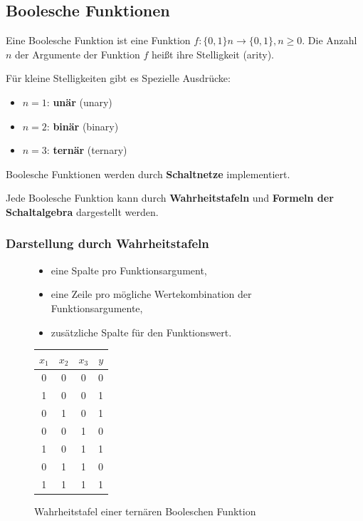 \documentclass[12pt]{report}
\begin{document}
\subsection{Boolesche Funktionen}
\begin{defbox}
  Eine Boolesche Funktion ist eine Funktion $f : \{0, 1\}n \rightarrow \{0, 1\}, n \geq 0$.
  Die Anzahl $n$ der Argumente der Funktion $f$ heißt ihre Stelligkeit (arity).
  
  Für kleine Stelligkeiten gibt es Spezielle Ausdrücke:
  \begin{itemize}
    \item $n=1$: \textbf{unär} (unary)
    \item $n=2$: \textbf{binär} (binary)
    \item $n=3$: \textbf{ternär} (ternary)
  \end{itemize}
  
  Boolesche Funktionen werden durch \textbf{Schaltnetze} implementiert.
\end{defbox}

Jede Boolesche Funktion kann durch \textbf{Wahrheitstafeln} und \textbf{Formeln der Schaltalgebra} dargestellt werden.

\subsubsection{Darstellung durch Wahrheitstafeln}
\begin{figure}[H]
  \begin{minipage}[t]{0.5\textwidth}
    \begin{itemize}
      \item eine Spalte pro Funktionsargument,
      \item eine Zeile pro mögliche Wertekombination der Funktionsargumente,
      \item zusätzliche Spalte für den Funktionswert.
    \end{itemize}
  \end{minipage}
  \hfill
  \begin{minipage}[t]{0.4\textwidth}
    \caption{Wahrheitstafel einer ternären Booleschen Funktion}
    \centering
    \begin{tabular}{ccc|c}
      $x_1$ & $x_2$ & $x_3$ & $y$  \\ \hline
      0     & 0     & 0     & 0    \\
      1     & 0     & 0     & 1    \\
      0     & 1     & 0     & 1    \\
      0     & 0     & 1     & 0    \\
      1     & 0     & 1     & 1    \\
      0     & 1     & 1     & 0    \\
      1     & 1     & 1     & 1   
    \end{tabular}
  \end{minipage}
\end{figure}
\end{document}
